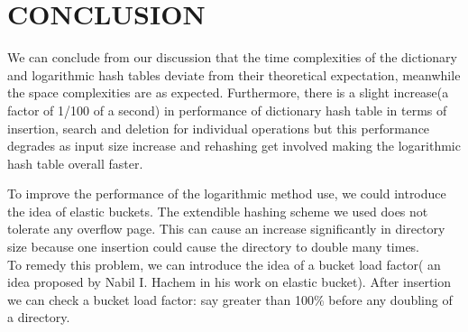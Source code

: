 \documentclass[a4paper,12pt, openany]{book}
\begin{document}
\chapter{CONCLUSION} 
\label{chap:CONCLUSION}
We can conclude from our discussion that the time complexities of the dictionary and logarithmic hash tables deviate from their theoretical expectation, meanwhile the space complexities are as expected. Furthermore, there is a slight increase(a factor of 1/100 of a second) in performance of dictionary hash table in terms of insertion, search and deletion for individual operations but this performance degrades as input size increase and rehashing get involved making the logarithmic hash table overall faster. 

 \bigbreak
To improve the performance of the logarithmic method use, we could introduce the idea of elastic buckets. The extendible hashing scheme we used does not tolerate any overflow page. This can cause an increase significantly in directory size because one insertion could cause the directory to double many times. \\
To remedy this problem, we can introduce the idea of a bucket load factor( an idea proposed by Nabil I. Hachem \cite{hachem1993approximate} in his work on elastic bucket). After insertion we can check a bucket load factor: say greater than 100$\%$ before any doubling of a directory.



\backmatter
\renewcommand{\bibname}{References}
\printbibliography
\end{document}
